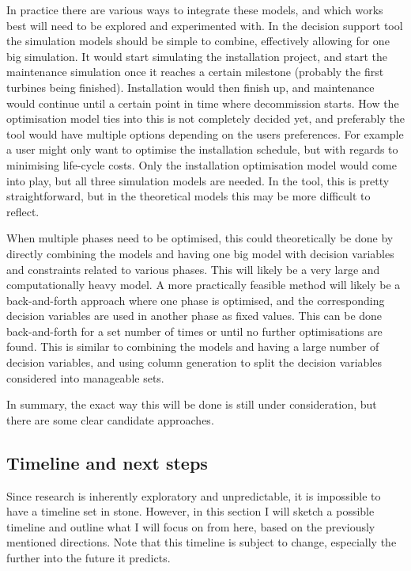 \documentclass[a4paper,12pt]{article}
\begin{document}
In practice there are various ways to integrate these models, and which works best will need to be explored and experimented with. In the decision support tool the simulation models should be simple to combine, effectively allowing for one big simulation. It would start simulating the installation project, and start the maintenance simulation once it reaches a certain milestone (probably the first turbines being finished). Installation would then finish up, and maintenance would continue until a certain point in time where decommission starts. How the optimisation model ties into this is not completely decided yet, and preferably the tool would have multiple options depending on the users preferences. For example a user might only want to optimise the installation schedule, but with regards to minimising life-cycle costs. Only the installation optimisation model would come into play, but all three simulation models are needed. In the tool, this is pretty straightforward, but in the theoretical models this may be more difficult to reflect. 

When multiple phases need to be optimised, this could theoretically be done by directly combining the models and having one big model with decision variables and constraints related to various phases. This will likely be a very large and computationally heavy model. A more practically feasible method will likely be a back-and-forth approach where one phase is optimised, and the corresponding decision variables are used in another phase as fixed values. This can be done back-and-forth for a set number of times or until no further optimisations are found. This is similar to combining the models and having a large number of decision variables, and using column generation to split the decision variables considered into manageable sets. 

In summary, the exact way this will be done is still under consideration, but there are some clear candidate approaches. 

\subsection{Timeline and next steps} \label{ss:timel}
Since research is inherently exploratory and unpredictable, it is impossible to have a timeline set in stone. However, in this section I will sketch a possible timeline and outline what I will focus on from here, based on the previously mentioned directions. Note that this timeline is subject to change, especially the further into the future it predicts. 
\end{document}
